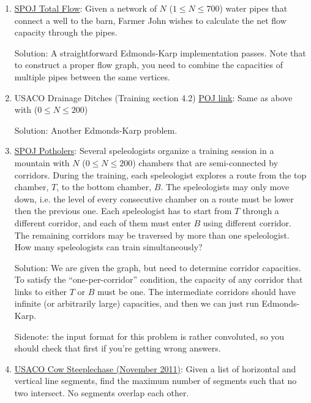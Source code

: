 \documentclass[11pt, oneside]{article}
\begin{document}
\begin{enumerate}
   \item \href{https://www.spoj.com/problems/MTOTALF/}{SPOJ Total Flow}: Given a network of \( N \) (\( 1 \leq N \leq 700 \)) water pipes that connect a well to the barn, Farmer John wishes to calculate the net flow capacity through the pipes.

   Solution: A straightforward Edmonds-Karp implementation passes. Note that to construct a proper flow graph, you need to combine the capacities of multiple pipes between the same vertices.

   \item USACO Drainage Ditches (Training section 4.2) \href{http://poj.org/problem?id=1273}{POJ link}: Same as above with (\( 0 \leq N \leq 200 \))

   Solution: Another Edmonds-Karp problem.

   \item \href{https://www.spoj.com/problems/POTHOLE/}{SPOJ Potholers}: Several speleologists organize a training session in a mountain with \( N \) (\( 0 \leq N \leq 200 \)) chambers that are semi-connected by corridors. During the training, each speleologist explores a route from the top chamber, \( T \), to the bottom chamber, \( B \). The speleologists may only move down, i.e. the level of every consecutive chamber on a route must be lower then the previous one. Each speleologist has to start from \( T \) through a different corridor, and each of them must enter \( B \) using different corridor. The remaining corridors may be traversed by more than one speleologist. How many speleologists can train simultaneously?

   Solution: We are given the graph, but need to determine corridor capacities. To satisfy the ``one-per-corridor'' condition, the capacity of any corridor that links to either \( T \) or \( B \) must be one. The intermediate corridors should have infinite (or arbitrarily large) capacities, and then we can just run Edmonds-Karp.

   Sidenote: the input format for this problem is rather convoluted, so you should check that first if you're getting wrong answers.

   \item \href{http://www.usaco.org/index.php?page=viewproblem2&cpid=93}{USACO Cow Steeplechase (November 2011)}: Given a list of horizontal and vertical line segments, find the maximum number of segments such
   that no two intersect. No segments overlap each other.


\end{enumerate}
\end{document}
